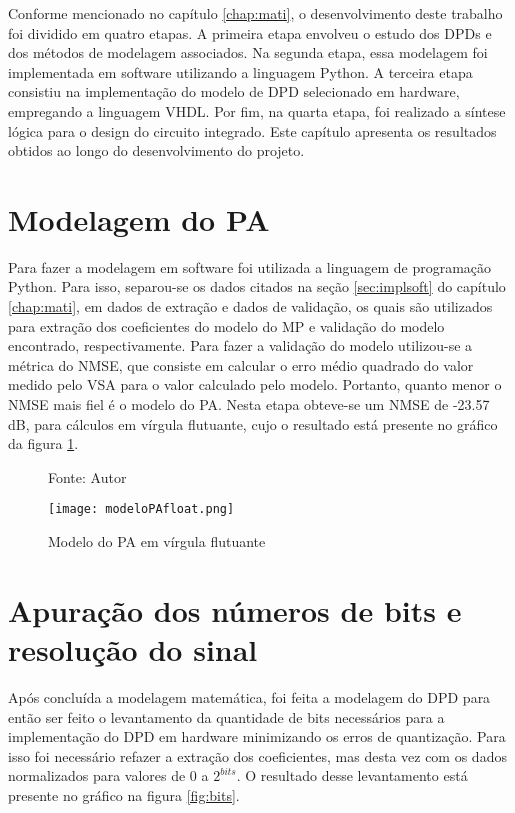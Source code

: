 Conforme mencionado no capítulo \ref{chap:mati}, o desenvolvimento deste trabalho foi dividido em quatro etapas. A primeira etapa envolveu o estudo dos DPDs e dos métodos de modelagem associados. Na segunda etapa, essa modelagem foi implementada em software utilizando a linguagem Python. A terceira etapa consistiu na implementação do modelo de DPD selecionado em hardware, empregando a linguagem VHDL. Por fim, na quarta etapa, foi realizado a síntese lógica para o design do circuito integrado. Este capítulo apresenta os resultados obtidos ao longo do desenvolvimento do projeto.

\section{Modelagem do PA}

Para fazer a modelagem em software foi utilizada a linguagem de programação Python. Para isso, separou-se os dados citados na seção \ref{sec:implsoft} do capítulo \ref{chap:mati}, em dados de extração e dados de validação, os quais são utilizados para extração dos coeficientes do modelo do MP e validação do modelo encontrado, respectivamente. Para fazer a validação do modelo utilizou-se a métrica do NMSE, que consiste em calcular o erro médio quadrado do valor medido pelo VSA para o valor calculado pelo modelo. Portanto, quanto menor o NMSE mais fiel é o modelo do PA. Nesta etapa obteve-se um NMSE de -23.57 dB, para cálculos em vírgula flutuante, cujo o resultado está presente no gráfico da figura \ref{fig:modelopafloat}.

\begin{figure}[ht!]
    \centering
    \captionsetup{justification=centering}
    \caption*{Fonte: Autor}
    \texttt{[image: modeloPAfloat.png]}
    \caption{Modelo do PA em vírgula flutuante}
    \label{fig:modelopafloat}
\end{figure}

\section{Apuração dos números de bits e resolução do sinal} 

Após concluída a modelagem matemática, foi feita a modelagem do DPD para então ser feito o levantamento da quantidade de bits necessários para a implementação do DPD em hardware minimizando os erros de quantização. 
Para isso foi necessário refazer a extração dos coeficientes, mas desta vez com os dados normalizados para valores de 0 a $2^{bits}$.  
O resultado desse levantamento está presente no gráfico na figura \ref{fig:bits}.

